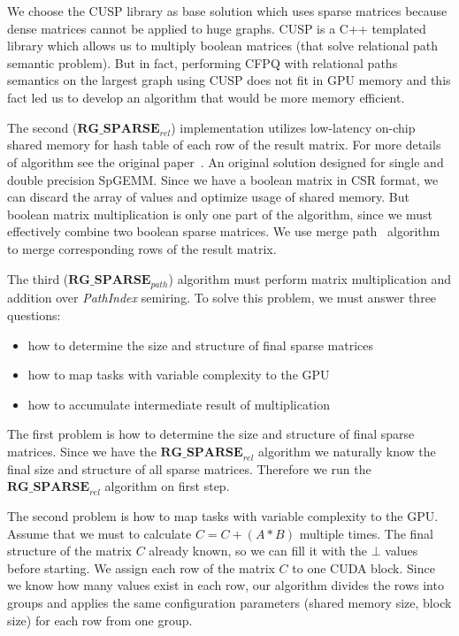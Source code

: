 We choose the CUSP library as base solution which uses sparse matrices because dense matrices cannot be applied to huge graphs. CUSP is a C++ templated library which allows us to multiply boolean matrices (that solve relational path semantic problem). But in fact, performing CFPQ with relational paths semantics on the largest graph using CUSP does not fit in GPU memory and this fact led us to develop an algorithm that would be more memory efficient.

The second ($\textbf{RG\_SPARSE}_{rel}$) implementation utilizes low-latency on-chip shared memory for hash table of each row of the result matrix. For more details of algorithm see the original paper~\cite{NsparsePaper}. An original solution designed for single and double precision SpGEMM. Since we have a boolean matrix in CSR format, we can discard the array of values and optimize usage of shared memory. But boolean matrix multiplication is only one part of the algorithm, since we must effectively combine two boolean sparse matrices. We use merge path~\cite{GpuMergePathPaper} algorithm to merge corresponding rows of the result matrix.

The third ($\textbf{RG\_SPARSE}_{path}$) algorithm must perform matrix multiplication and addition over \textit{PathIndex} semiring. To solve this problem, we must answer three questions: 

\begin{itemize}
  \item how to determine the size and structure of final sparse matrices
  \item how to map tasks with variable complexity to the GPU
  \item how to accumulate intermediate result of multiplication
\end{itemize}

The first problem is how to determine the size and structure of final sparse matrices. Since we have the $\textbf{RG\_SPARSE}_{rel}$ algorithm we naturally know the final size and structure of all sparse matrices. Therefore we run the $\textbf{RG\_SPARSE}_{rel}$ algorithm on first step.

The second problem is how to map tasks with variable complexity to the GPU. Assume that we must to calculate $C = C + (A * B)$ multiple times. The final structure of the matrix $C$ already known, so we can fill it with the $\bot$ values before starting. We assign each row of the matrix $C$ to one CUDA block. Since we know how many values exist in each row, our algorithm divides the rows into groups and applies the same configuration parameters (shared memory size, block size) for each row from one group.
 
